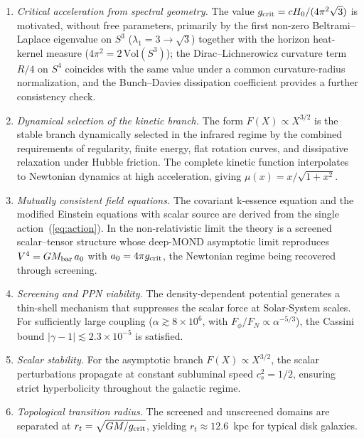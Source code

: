 \documentclass[11pt,a4paper]{article}
\begin{document}
\begin{enumerate}
\item \textit{Critical acceleration from spectral geometry.} The value
  $g_{\rm crit} = cH_0/(4\pi^2\sqrt{3})$ is motivated, without free parameters, primarily
  by the first non-zero Beltrami--Laplace eigenvalue on $S^3$ ($\lambda_1 = 3 \to \sqrt{3}$)
  together with the horizon heat-kernel measure ($4\pi^2 = 2\,\mathrm{Vol}(S^3)$); the
  Dirac--Lichnerowicz curvature term $R/4$ on $S^4$ coincides with the same value under a
  common curvature-radius normalization, and the Bunch--Davies dissipation coefficient
  provides a further consistency check.

\item \textit{Dynamical selection of the kinetic branch.} The form $F(X)\propto X^{3/2}$
  is the stable branch dynamically selected in the infrared regime by the combined
  requirements of regularity, finite energy, flat rotation curves, and dissipative
  relaxation under Hubble friction. The complete kinetic function interpolates to
  Newtonian dynamics at high acceleration, giving $\mu(x) = x/\sqrt{1+x^2}$.

\item \textit{Mutually consistent field equations.} The covariant k-essence equation
  and the modified Einstein equations with scalar source are derived from the single
  action~(\ref{eq:action}). In the non-relativistic limit the theory is a screened
  scalar--tensor structure whose deep-MOND asymptotic limit reproduces
  $V^4 = GM_{\rm bar}\,a_0$ with $a_0 = 4\pi g_{\rm crit}$, the Newtonian regime being
  recovered through screening.

\item \textit{Screening and PPN viability.} The density-dependent potential generates
  a thin-shell mechanism that suppresses the scalar force at Solar-System scales.
  For sufficiently large coupling ($\alpha\gtrsim8\times10^{6}$, with
  $F_\phi/F_N\propto\alpha^{-5/3}$), the Cassini bound
  $|\gamma-1|\lesssim2.3\times10^{-5}$ is satisfied.

\item \textit{Scalar stability.} For the asymptotic branch $F(X)\propto X^{3/2}$,
  the scalar perturbations propagate at constant subluminal speed $c_s^2 = 1/2$,
  ensuring strict hyperbolicity throughout the galactic regime.

\item \textit{Topological transition radius.} The screened and unscreened domains
  are separated at $r_t = \sqrt{GM/g_{\rm crit}}$, yielding $r_t\approx12.6$~kpc
  for typical disk galaxies.


\end{enumerate}
\end{document}
